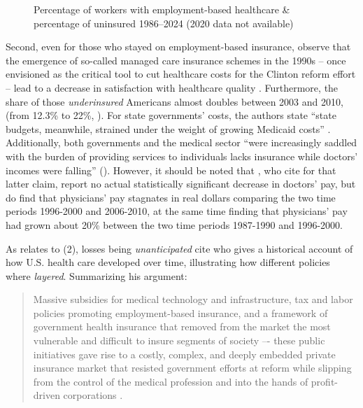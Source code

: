 \documentclass[11pt]{article}
\begin{document}
\begin{figure}[H]
  \sffamily
  \caption{Percentage of workers with employment-based healthcare \& percentage of uninsured 1986--2024 (2020 data not available)}
  
  \label{fig:emp_un}
\end{figure}

Second, even for those who stayed on employment-based insurance, \textcite[][]{Jacobs2014} observe that the emergence of so-called managed care insurance schemes in the 1990s -- once envisioned as the critical tool to cut healthcare costs for the Clinton reform effort -- lead to a decrease in satisfaction with healthcare quality \parencite[see][]{Thorpe1999}. Furthermore, the share of those \textit{underinsured} Americans almost doubles between 2003 and 2010, (from 12.3\% to 22\%, ). For state governments' costs, the authors state \enquote{state budgets, meanwhile, strained under the weight of growing Medicaid costs} \parencite[][p. 451]{Jacobs2014}. Additionally, both governments and the medical sector \enquote{were increasingly saddled with the burden of providing services to individuals lacks insurance while doctors' incomes were falling} (). However, it should be noted that \textcite[][]{Seabury2012}, who \textcite[][]{Jacobs2014} cite for that latter claim, report no actual statistically significant decrease in doctors' pay, but do find that physicians' pay stagnates in real dollars comparing the two time periods 1996-2000 and 2006-2010, at the same time finding that physicians' pay had grown about 20\% between the two time periods 1987-1990 and 1996-2000.

As relates to (2), losses being \textit{unanticipated} \textcite[][]{Jacobs2014} cite \textcite[][]{Hacker1998} who gives a historical account of how U.S. health care developed over time, illustrating how different policies where \textit{layered}. Summarizing his argument:

\begin{quote}
  Massive subsidies for medical technology and infrastructure, tax and labor policies promoting employment-based insurance, and a framework of government health insurance that removed from the market the most vulnerable and difficult to insure segments of society –- these public initiatives gave rise to a costly, complex, and deeply embedded private insurance market that resisted government efforts at reform while slipping from the control of the medical profession and into the hands of profit-driven corporations \parencite[][p. 107]{Hacker1998}.
\end{quote}
\end{document}
